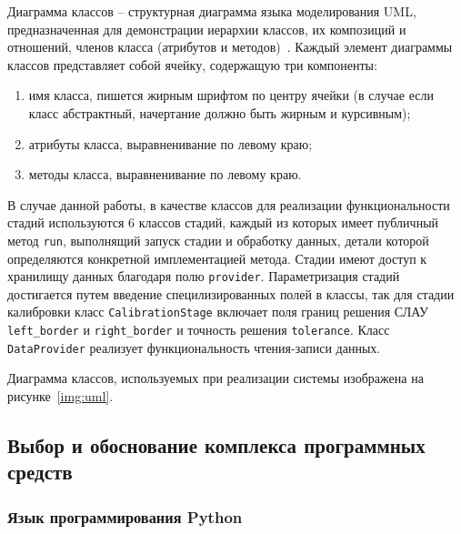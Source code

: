 Диаграмма классов -- структурная диаграмма языка моделирования UML, предназначенная для демонстрации иерархии классов,
их композиций и отношений, членов класса (атрибутов и методов)~\autocite{impl:ad}. Каждый элемент диаграммы классов представляет собой
ячейку, содержащую три компоненты:
\begin{enumerate}
    \item имя класса, пишется жирным шрифтом по центру ячейки (в случае если класс абстрактный, начертание должно быть жирным
    и курсивным);
    \item атрибуты класса, выравненивание по левому краю;
    \item методы класса, выравненивание по левому краю.
\end{enumerate}

В случае данной работы, в качестве классов для реализации функциональности стадий используются 6 классов стадий, каждый
из которых имеет публичный метод \texttt{run}, выполнящий запуск стадии и обработку данных, детали которой определяются
конкретной имплементацией метода. Стадии имеют доступ к хранилищу данных благодаря полю \texttt{provider}. Параметризация
стадий достигается путем введение специлизированных полей в классы, так для стадии калибровки класс \texttt{CalibrationStage}
включает поля границ решения СЛАУ \texttt{left\_border} и \texttt{right\_border} и точность решения \texttt{tolerance}. Класс
\texttt{DataProvider} реализует функциональность чтения-записи данных. 

Диаграмма классов, используемых при реализации системы изображена
на рисунке~\eqref{img:uml}.


\subsection{Выбор и обоснование комплекса программных средств}
\subsubsection{Язык программирования Python}


